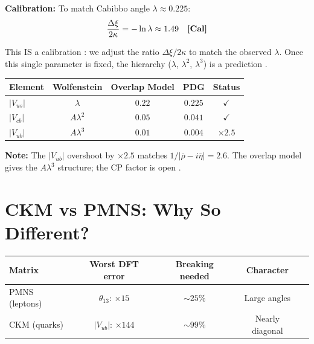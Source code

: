 \textbf{Calibration:} To match Cabibbo angle $\lambda \approx 0.225$:
\begin{equation}
    \frac{\Delta\xi}{2\kappa} = -\ln\lambda \approx 1.49
    \quad \textbf{[Cal]}{}
\end{equation}

This IS a calibration \tagCal{}: we adjust the ratio $\Delta\xi/2\kappa$ to match the observed $\lambda$.
Once this single parameter is fixed, the hierarchy ($\lambda$, $\lambda^2$, $\lambda^3$) is a prediction \tagDc{}.

\begin{center}
\begin{tabular}{lcccc}
\toprule
\textbf{Element} & \textbf{Wolfenstein} & \textbf{Overlap Model} & \textbf{PDG} & \textbf{Status} \\
\midrule
$|V_{us}|$ & $\lambda$ & $0.22$ & $0.225$ & $\checkmark$ \\
$|V_{cb}|$ & $A\lambda^2$ & $0.05$ & $0.041$ & $\checkmark$ \\
$|V_{ub}|$ & $A\lambda^3$ & $0.01$ & $0.004$ & $\times 2.5$ \\
\bottomrule
\end{tabular}
\end{center}

\textbf{Note:} The $|V_{ub}|$ overshoot by $\times 2.5$ matches $1/|\bar\rho - i\bar\eta| = 2.6$.
The overlap model gives the $A\lambda^3$ structure; the CP factor is open \tagOpen{}.

\section{CKM vs PMNS: Why So Different?}
\label{sec:ckm_vs_pmns}

\begin{center}
\begin{tabular}{lcccc}
\toprule
\textbf{Matrix} & \textbf{Worst DFT error} & \textbf{Breaking needed} & \textbf{Character} \\
\midrule
PMNS (leptons) & $\theta_{13}$: $\times 15$ & $\sim 25\%$ & Large angles \\
CKM (quarks) & $|V_{ub}|$: $\times 144$ & $\sim 99\%$ & Nearly diagonal \\
\bottomrule
\end{tabular}
\end{center}

